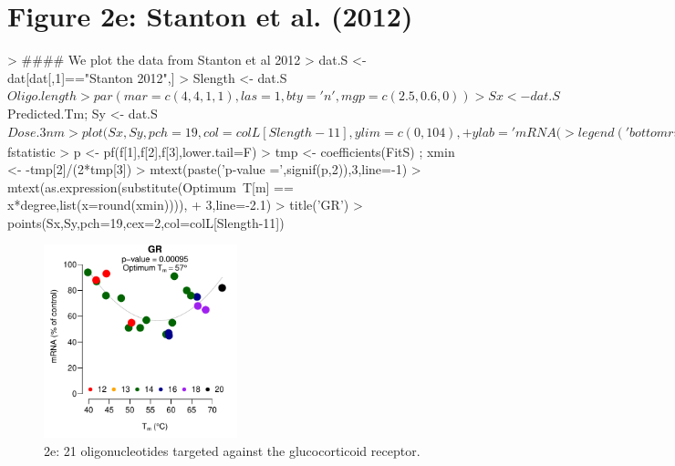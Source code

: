\documentclass{article}
\newenvironment{Ncenter}{%
  \setlength\topsep{-10pt}
  \setlength\parskip{-100pt}
  \begin{center}
}{%
  \end{center}
}
\begin{document}
\section*{Figure 2e: Stanton et al. (2012)}
\begin{Schunk}
\begin{Sinput}
> #### We plot the data from Stanton et al 2012
> dat.S <- dat[dat[,1]=="Stanton 2012",]
> Slength <- dat.S$Oligo.length
> par(mar=c(4,4,1,1),las=1,bty='n',mgp=c(2.5,0.6,0))
> Sx <- dat.S$Predicted.Tm; Sy <- dat.S$Dose.3nm
> plot(Sx,Sy, pch=19,col=colL[Slength-11],ylim=c(0,104),
+      ylab='mRNA (%
> legend('bottomright',as.character(sort(unique(OLength))),
+        pch=19,col=colL[sort(unique(OLength))-11],bg='white',horiz=T,bty='n')
> FitS <- lm(Sy ~ Sx + I(Sx^2))
> Parfun <- function(D1){
+   tmp <- coefficients(FitS) 
+   tmp[1]+tmp[2]*D1+tmp[3]*D1^2}
> curve(Parfun(x),min(Sx),max(Sx), lwd=1,add=T,col='grey')
> f <- summary(FitS)$fstatistic
> p <- pf(f[1],f[2],f[3],lower.tail=F)
> tmp <- coefficients(FitS) ; xmin <- -tmp[2]/(2*tmp[3])
> mtext(paste('p-value =',signif(p,2)),3,line=-1)
> mtext(as.expression(substitute(Optimum~T[m] == x*degree,list(x=round(xmin)))),
+       3,line=-2.1)
> title('GR')
> points(Sx,Sy,pch=19,cex=2,col=colL[Slength-11])
\end{Sinput}
\end{Schunk}
\begin{figure}[!h]
\begin{Ncenter}
\includegraphics[width=0.5\textwidth]{Vignette2-Fig5}
\end{Ncenter}
\caption{2e: 21 oligonucleotides targeted against the glucocorticoid receptor.}
\end{figure}
\end{document}
